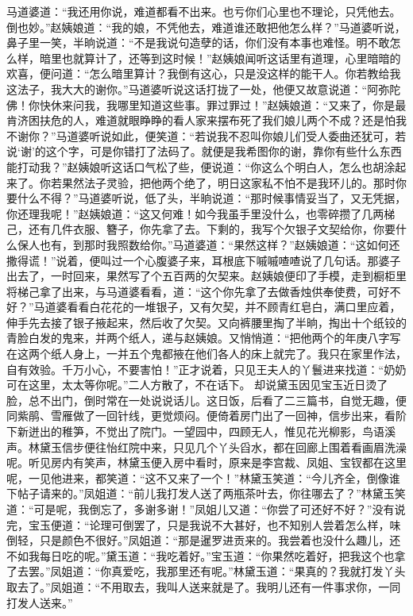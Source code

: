 \documentclass[12pt,oneside]{book}
\begin{document}
马道婆道：“我还用你说，难道都看不出来。也亏你们心里也不理论，只凭他去。倒也妙。”赵姨娘道：“我的娘，不凭他去，难道谁还敢把他怎么样？”马道婆听说，鼻子里一笑，半晌说道：“不是我说句造孽的话，你们没有本事也难怪。明不敢怎么样，暗里也就算计了，还等到这时候！”赵姨娘闻听这话里有道理，心里暗暗的欢喜，便问道：“怎么暗里算计？我倒有这心，只是没这样的能干人。你若教给我这法子，我大大的谢你。”马道婆听说这话打拢了一处，他便又故意说道：“阿弥陀佛！你快休来问我，我哪里知道这些事。罪过罪过！”赵姨娘道：“又来了，你是最肯济困扶危的人，难道就眼睁睁的看人家来摆布死了我们娘儿两个不成？还是怕我不谢你？”马道婆听说如此，便笑道：“若说我不忍叫你娘儿们受人委曲还犹可，若说‘谢’的这个字，可是你错打了法码了。就便是我希图你的谢，靠你有些什么东西能打动我？”赵姨娘听这话口气松了些，便说道：“你这么个明白人，怎么也胡涂起来了。你若果然法子灵验，把他两个绝了，明日这家私不怕不是我环儿的。那时你要什么不得？”马道婆听说，低了头，半晌说道：“那时候事情妥当了，又无凭据，你还理我呢！”赵姨娘道：“这又何难！如今我虽手里没什么，也零碎攒了几两梯己，还有几件衣服、簪子，你先拿了去。下剩的，我写个欠银子文契给你，你要什么保人也有，到那时我照数给你。”马道婆道：“果然这样？”赵姨娘道：“这如何还撒得谎！”说着，便叫过一个心腹婆子来，耳根底下嘁嘁喳喳说了几句话。那婆子出去了，一时回来，果然写了个五百两的欠契来。赵姨娘便印了手模，走到橱柜里将梯己拿了出来，与马道婆看看，道：“这个你先拿了去做香烛供奉使费，可好不好？”马道婆看看白花花的一堆银子，又有欠契，并不顾青红皂白，满口里应着，伸手先去接了银子掖起来，然后收了欠契。又向裤腰里掏了半晌，掏出十个纸铰的青脸白发的鬼来，并两个纸人，递与赵姨娘。又悄悄道：“把他两个的年庚八字写在这两个纸人身上，一并五个鬼都掖在他们各人的床上就完了。我只在家里作法，自有效验。千万小心，不要害怕！”正才说着，只见王夫人的丫鬟进来找道：“奶奶可在这里，太太等你呢。”二人方散了，不在话下。
却说黛玉因见宝玉近日烫了脸，总不出门，倒时常在一处说说话儿。这日饭，后看了二三篇书，自觉无趣，便同紫鹃、雪雁做了一回针线，更觉烦闷。便倚着房门出了一回神，信步出来，看阶下新迸出的稚笋，不觉出了院门。一望园中，四顾无人，惟见花光柳影，鸟语溪声。林黛玉信步便往怡红院中来，只见几个丫头舀水，都在回廊上围着看画眉洗澡呢。听见房内有笑声，林黛玉便入房中看时，原来是李宫裁、凤姐、宝钗都在这里呢，一见他进来，都笑道：“这不又来了一个！”林黛玉笑道：“今儿齐全，倒像谁下帖子请来的。”凤姐道：“前儿我打发人送了两瓶茶叶去，你往哪去了？”林黛玉笑道：“可是呢，我倒忘了，多谢多谢！”凤姐儿又道：“你尝了可还好不好？”没有说完，宝玉便道：“论理可倒罢了，只是我说不大甚好，也不知别人尝着怎么样，味倒轻，只是颜色不很好。”凤姐道：“那是暹罗进贡来的。我尝着也没什么趣儿，还不如我每日吃的呢。”黛玉道：“我吃着好。”宝玉道：“你果然吃着好，把我这个也拿了去罢。”凤姐道：“你真爱吃，我那里还有呢。”林黛玉道：“果真的？我就打发丫头取去了。”凤姐道：“不用取去，我叫人送来就是了。我明儿还有一件事求你，一同打发人送来。”
\end{document}
